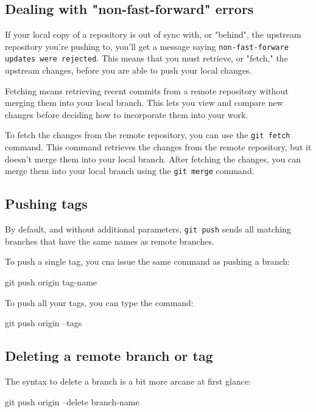 \newpage
\subsection{Dealing with "non-fast-forward" errors}

If your local copy of a repository is out of sync with, or "behind", the upstream repository you're pushing to, you'll get a message saying \texttt{non-fast-forware updates were rejected}. This means that you must retrieve, or "fetch," the upstream changes, before you are able to push your local changes.

\begin{tipsblock}[Fetching]
    Fetching means retrieving recent commits from a remote repository without merging them into your local branch. This lets you view and compare new changes before deciding how to incorporate them into your work.
\end{tipsblock}

To fetch the changes from the remote repository, you can use the \texttt{git fetch} command. This command retrieves the changes from the remote repository, but it doesn't merge them into your local branch. After fetching the changes, you can merge them into your local branch using the \texttt{git merge} command.

\subsection{Pushing tags}

By default, and without additional parameters, \texttt{git push} sends all matching branches that have the same names as remote branches. 

To push a single tag, you cna issue the same command as pushing a branch:
\begin{codeblock}[language=bash]
git push origin tag-name
\end{codeblock}

To push all your tags, you can type the command:
\begin{codeblock}[language=bash]
git push origin --tags
\end{codeblock}

\subsection{Deleting a remote branch or tag}

The syntax to delete a branch is a bit more arcane at first glance:
\begin{codeblock}[language=bash]
git push origin --delete branch-name
\end{codeblock}

